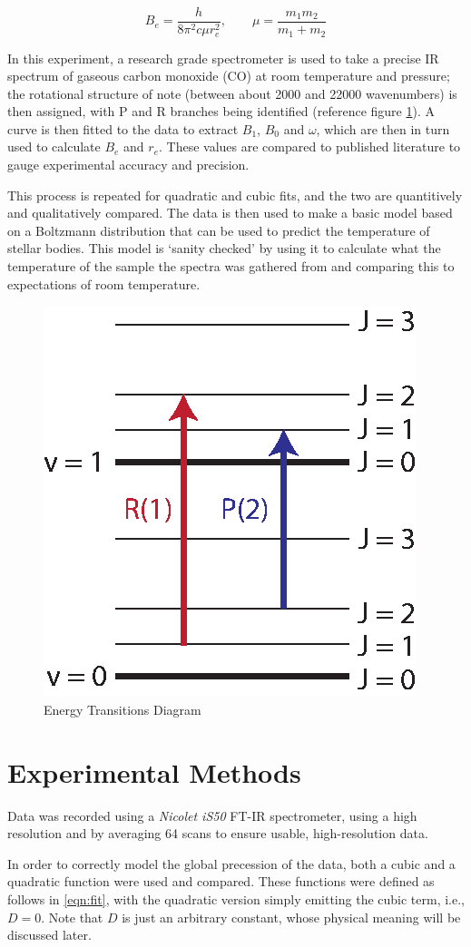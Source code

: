 \documentclass[aps,prl,reprint,10pt,amsmath,amssymb,superscriptaddress,a4paper]{revtex4-2}
\begin{document}
\begin{equation}
\label{eqn:B}
B_e = \frac{h}{8 \pi^2 c \mu r_e^2}, \qquad \mu = \frac{m_1 m_2}{m_1 + m_2} 
\end{equation}

In this experiment, a research grade spectrometer is used to take a precise IR spectrum of gaseous carbon monoxide (CO) at room temperature and pressure; the rotational structure of note (between about 2000 and 22000 wavenumbers) is then assigned, with P and R branches being identified (reference figure \ref{fig:transitions}). A curve is then fitted to the data to extract $B_1$, $B_0$ and $\omega$, which are then in turn used to calculate $B_e$ and $r_e$. These values are compared to published literature to gauge experimental accuracy and precision.

This process is repeated for quadratic and cubic fits, and the two are quantitively and qualitatively compared. The data is then used to make a basic model based on a Boltzmann distribution that can be used to predict the temperature of stellar bodies. This model is ‘sanity checked’ by using it to calculate what the temperature of the sample the spectra was gathered from and comparing this to expectations of room temperature.

\begin{figure}[t]
\includegraphics[width = 5 cm]{Transitions.eps}
\caption{Energy Transitions Diagram}
\label{fig:transitions}
\end{figure}

\section{Experimental Methods}

Data was recorded using a {\it Nicolet iS50} FT-IR spectrometer, using a high resolution and by averaging 64 scans to ensure usable, high-resolution data.

In order to correctly model the global precession of the data, both a cubic and a quadratic function were used and compared. These functions were defined as follows in \ref{eqn:fit}, with the quadratic version simply emitting the cubic term, i.e., $ D = 0$. Note that $D$ is just an arbitrary constant, whose physical meaning will be discussed later.
\end{document}
